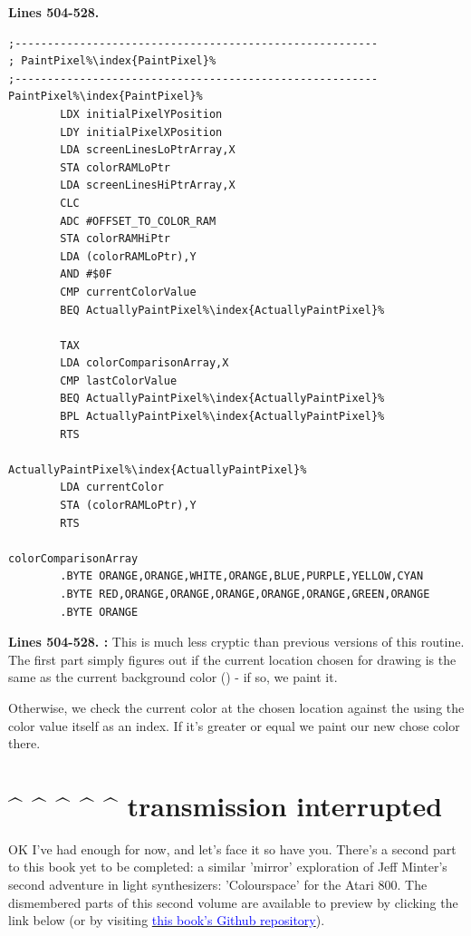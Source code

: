 \textbf{Lines 504-528. } 
\begin{lstlisting}[caption = All the pattern data structures in Psychedelia organized into a set of arrays.,escapechar=\%]
;--------------------------------------------------------
; PaintPixel%\index{PaintPixel}%
;--------------------------------------------------------
PaintPixel%\index{PaintPixel}%   
        LDX initialPixelYPosition
        LDY initialPixelXPosition
        LDA screenLinesLoPtrArray,X
        STA colorRAMLoPtr
        LDA screenLinesHiPtrArray,X
        CLC 
        ADC #OFFSET_TO_COLOR_RAM
        STA colorRAMHiPtr
        LDA (colorRAMLoPtr),Y
        AND #$0F
        CMP currentColorValue
        BEQ ActuallyPaintPixel%\index{ActuallyPaintPixel}%

        TAX 
        LDA colorComparisonArray,X
        CMP lastColorValue
        BEQ ActuallyPaintPixel%\index{ActuallyPaintPixel}%
        BPL ActuallyPaintPixel%\index{ActuallyPaintPixel}%
        RTS 

ActuallyPaintPixel%\index{ActuallyPaintPixel}%   
        LDA currentColor
        STA (colorRAMLoPtr),Y
        RTS 

colorComparisonArray   
        .BYTE ORANGE,ORANGE,WHITE,ORANGE,BLUE,PURPLE,YELLOW,CYAN
        .BYTE RED,ORANGE,ORANGE,ORANGE,ORANGE,ORANGE,GREEN,ORANGE
        .BYTE ORANGE

\end{lstlisting}
\clearpage

\textbf{Lines 504-528. :} This is much less cryptic than previous versions of this routine. The first part
simply figures out if the current location chosen for drawing is the same as the current background color () - if so,
we paint it.

Otherwise, we check the current color at the chosen location against the  using the color value itself as an index.
If it's greater or equal we paint our new chose color there.

\section*{\string^ \string^ \string^ \string^ \string^ transmission interrupted}
\vspace{-0.3cm}
OK I've had enough for now, and let's face it so have you. There's a second part to this book yet to be completed: a similar 'mirror' exploration
of Jeff Minter's second adventure in light synthesizers: 'Colourspace' for the Atari 800. The dismembered parts of this second volume are available
to preview by clicking the link below (or by visiting \href{https://github.com/mwenge/psypixels}{\textcolor{blue}{ this book's Github repository}}). 

